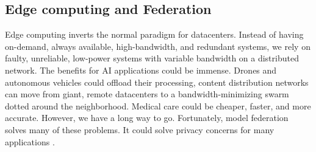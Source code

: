 \documentclass[conference]{IEEEtran}
\begin{document}
\subsection{Edge computing and Federation}
Edge computing \cite{li2019edge, deng2020edge} inverts the normal paradigm for datacenters. Instead of having on-demand, always available, high-bandwidth, and redundant systems, we rely on faulty, unreliable, low-power systems with variable bandwidth on a distributed network. The benefits for AI applications could be immense. Drones and autonomous vehicles could offload their processing, content distribution networks can move from giant, remote datacenters to a bandwidth-minimizing swarm dotted around the neighborhood. Medical care could be cheaper, faster, and more accurate. However, we have a long way to go. Fortunately, model federation \cite{li2020review} solves many of these problems. It could solve privacy concerns for many applications \cite{shamimmachine, bhagoji2019analyzing}. 

\large 


\end{document}
